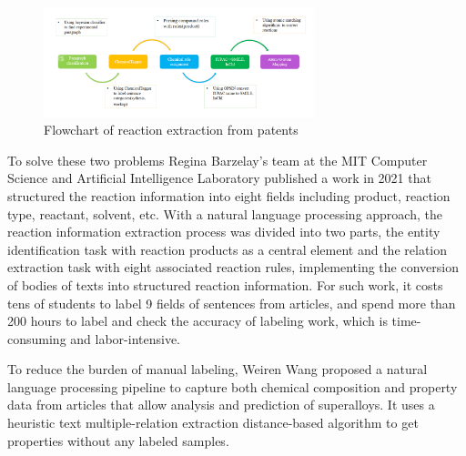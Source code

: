 \documentclass[%
 aip,
 jmp,%
 amsmath,amssymb,
 reprint,%
]{revtex4-2}
\begin{document}
\begin{figure}[htbp]
 \centering
 \includegraphics[width=0.7\textwidth]{figure/8.png}
 \caption{ Flowchart of reaction extraction from patents }
 \label{ Fig.8 }
\end{figure}

To solve these two problems Regina Barzelay's team at the MIT Computer Science and Artificial Intelligence Laboratory published a work 
in 2021 that structured the reaction information into eight fields including product, reaction type, reactant, solvent, etc. With a 
natural language processing approach, the reaction information extraction process was divided into two parts, the entity identification task
with reaction products as a central element and the relation extraction task with eight associated reaction rules,
implementing the conversion of bodies of texts into structured reaction information. For such work, it costs tens of students to label 9 fields of sentences 
from articles, and spend more than 200 hours to label and check the accuracy of labeling work, which is time-consuming and labor-intensive.

To reduce the burden of manual labeling, Weiren Wang proposed a natural language processing pipeline to capture both chemical composition and property data 
from articles that allow analysis and prediction of superalloys. It uses a heuristic text multiple-relation extraction distance-based algorithm to get 
properties without any labeled samples.
\end{document}
